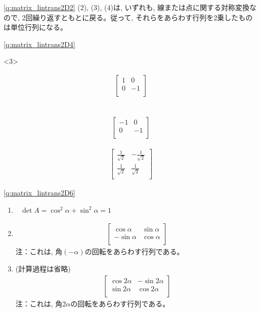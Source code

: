 %
\ref{q:matrix_lintrans2D2}  (2), (3), (4)は, いずれも, 線または点に関する対称変換なので, 
2回繰り返すともとに戻る。従って, それらをあらわす行列を2乗したもの
は単位行列になる。
\mv

%
\ref{q:matrix_lintrans2D4}  
\begin{edaenumerate}<3>
\item \begin{eqnarray*}\begin{bmatrix}
1 & 0 \\
0 & -1 \\\end{bmatrix}\end{eqnarray*}
\item　\begin{eqnarray*}\begin{bmatrix}
-1 & 0 \\
0 & -1 \\
\end{bmatrix}\end{eqnarray*}
\item \begin{eqnarray*}\begin{bmatrix}
\frac{1}{\sqrt{2}} & -\frac{1}{\sqrt{2}} \\
\frac{1}{\sqrt{2}} & \frac{1}{\sqrt{2}} \\
\end{bmatrix}\end{eqnarray*}
\end{edaenumerate}
\mv

\ref{q:matrix_lintrans2D6}　
\begin{enumerate}
\item $\,\,\,\,\det A=\cos^2\alpha+\sin^2\alpha=1$
\item \begin{eqnarray}
\begin{bmatrix}
\cos\alpha & \sin\alpha \\
-\sin\alpha & \cos\alpha \\\end{bmatrix}
\end{eqnarray}
注：これは, 角$(-\alpha)$の回転をあらわす行列である。
\item (計算過程は省略)
\begin{eqnarray}\begin{bmatrix}
\cos2\alpha & -\sin2\alpha \\
\sin2\alpha & \cos2\alpha \\\end{bmatrix}
\end{eqnarray}
注：これは, 角$2\alpha$の回転をあらわす行列である。
\end{enumerate}
